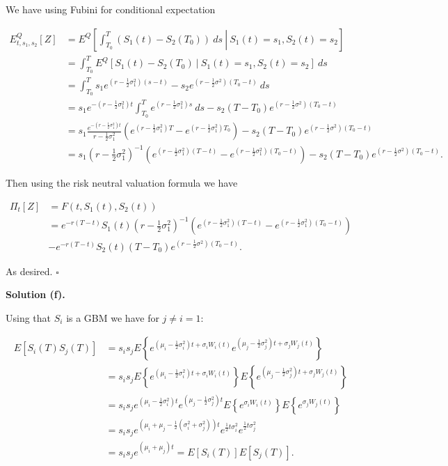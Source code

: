 \documentclass[
]{book}
\begin{document}
We have using Fubini for conditional expectation

\begin{align*}
E^Q_{t,s_1,s_2}\left[Z\right]&=E^Q\left[\left.\int_{T_0}^T(S_1(t)-S_2(T_0))\ ds \ \right\vert\ S_1(t)=s_1,S_2(t)=s_2\right]\\
&=\int_{T_0}^TE^Q\left[\left.S_1(t)-S_2(T_0) \ \right\vert\ S_1(t)=s_1,S_2(t)=s_2\right]\ ds\\
&=\int_{T_0}^T s_1e^{\left(r-\frac{1}{2}\sigma_1^2\right)(s-t)} -s_2e^{\left(r-\frac{1}{2}\sigma^2\right)(T_0-t)} \ ds\\
&=s_1e^{-\left(r-\frac{1}{2}\sigma_1^2\right)t}\int_{T_0}^T e^{\left(r-\frac{1}{2}\sigma_1^2\right)s}\ ds-s_2(T-T_0)e^{\left(r-\frac{1}{2}\sigma^2\right)(T_0-t)}\\
&=s_1\frac{e^{-\left(r-\frac{1}{2}\sigma_1^2\right)t}}{r-\frac{1}{2}\sigma_1^2}\left( e^{\left(r-\frac{1}{2}\sigma_1^2\right)T}- e^{\left(r-\frac{1}{2}\sigma_1^2\right)T_0}\right)-s_2(T-T_0)e^{\left(r-\frac{1}{2}\sigma^2\right)(T_0-t)}\\
&=s_1\left(r-\frac{1}{2}\sigma_1^2\right)^{-1}\left( e^{\left(r-\frac{1}{2}\sigma_1^2\right)(T-t)}- e^{\left(r-\frac{1}{2}\sigma_1^2\right)(T_0-t)}\right)-s_2(T-T_0)e^{\left(r-\frac{1}{2}\sigma^2\right)(T_0-t)}.
\end{align*}

Then using the risk neutral valuation formula we have

\begin{align*}
\Pi_t[Z]&=F(t,S_1(t),S_2(t))\\
&=e^{-r(T-t)}S_1(t)\left(r-\frac{1}{2}\sigma_1^2\right)^{-1}\left( e^{\left(r-\frac{1}{2}\sigma_1^2\right)(T-t)}- e^{\left(r-\frac{1}{2}\sigma_1^2\right)(T_0-t)}\right)\\
&-e^{-r(T-t)}S_2(t)(T-T_0)e^{\left(r-\frac{1}{2}\sigma^2\right)(T_0-t)}.
\end{align*}

As desired. \(\square\)

\noindent\makebox[\linewidth]{\rule{\textwidth}{0.4pt}}

\textbf{Solution (f).}

Using that \(S_i\) is a GBM we have for \(j\ne i=1\):

\begin{align*}
E[S_i(T)S_j(T)]&=s_is_jE\left\{e^{\left(\mu_i-\frac{1}{2}\sigma_i^2\right)t+\sigma_i W_i(t)}e^{\left(\mu_j-\frac{1}{2}\sigma_j^2\right)t+\sigma_j W_j(t)}\right\}\\
&=s_is_jE\left\{e^{\left(\mu_i-\frac{1}{2}\sigma_i^2\right)t+\sigma_i W_i(t)}\right\}E\left\{e^{\left(\mu_j-\frac{1}{2}\sigma_j^2\right)t+\sigma_j W_j(t)}\right\}\\
&=s_is_je^{\left(\mu_i-\frac{1}{2}\sigma_i^2\right)t}e^{\left(\mu_j-\frac{1}{2}\sigma_j^2\right)t}E\left\{e^{\sigma_i W_i(t)}\right\}E\left\{e^{\sigma_j W_j(t)}\right\}\\
&=s_is_je^{\left(\mu_i+\mu_j-\frac{1}{2}(\sigma_i^2+\sigma_j^2)\right)t}e^{\frac{1}{2}t\sigma_i^2}e^{\frac{1}{2}t\sigma_j^2}\\
&=s_is_je^{\left(\mu_i+\mu_j\right)t}=E[S_i(T)]E[S_j(T)].
\end{align*}
\end{document}
